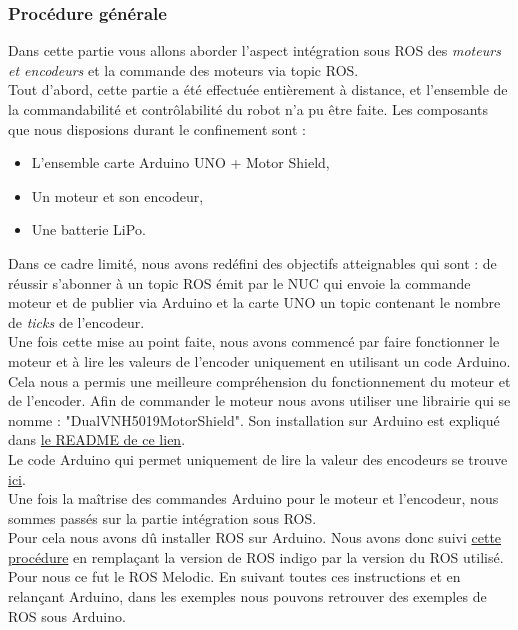 \documentclass[french]{rapportENSTAB}
\begin{document}
\subsubsection{Procédure générale}
Dans cette partie vous allons aborder l'aspect intégration sous ROS des \textit{moteurs et encodeurs} et la commande des moteurs via topic ROS.\\

Tout d'abord, cette partie a été effectuée entièrement à distance, et l'ensemble de la commandabilité et contrôlabilité du robot n'a pu être faite. Les composants que nous disposions durant le confinement sont : \begin{itemize}[label=\textbullet, font=\small\color{blue}]
    \item L'ensemble carte Arduino UNO + Motor Shield,
    \item Un moteur et son encodeur,
    \item Une batterie LiPo.
\end{itemize}

Dans ce cadre limité, nous avons redéfini des objectifs atteignables qui sont : de réussir s'abonner à un topic ROS émit par le NUC qui envoie la commande moteur et de publier via Arduino et la carte UNO un topic contenant le nombre de \textit{ticks} de l'encodeur.\\

Une fois cette mise au point faite, nous avons commencé par faire fonctionner le moteur et à lire les valeurs de l'encoder uniquement en utilisant un code Arduino. Cela nous a permis une meilleure compréhension du fonctionnement du moteur et de l'encoder. Afin de commander le moteur nous avons utiliser une librairie qui se nomme : "DualVNH5019MotorShield". Son installation sur Arduino est expliqué dans \href{https://github.com/AntoninLize/Projet_OrangeLabs/tree/master/Code/Arduino}{le README de ce lien}.\\

Le code Arduino qui permet uniquement de lire la valeur des encodeurs se trouve
\href{https://github.com/AntoninLize/Projet_OrangeLabs/tree/master/Code/Arduino/Encoder}{ici}.\\

Une fois la maîtrise des commandes Arduino pour le moteur et l'encodeur, nous sommes passés sur la partie intégration sous ROS.\\

Pour cela nous avons dû installer ROS sur Arduino. Nous avons donc suivi \href{http://wiki.ros.org/rosserial_arduino/Tutorials/Arduino%20IDE%20Setup}{cette procédure} en remplaçant la version de ROS indigo par la version du ROS utilisé. Pour nous ce fut le ROS Melodic. En suivant toutes ces instructions et en relançant Arduino, dans les exemples nous pouvons retrouver des exemples de ROS sous Arduino.\\ 
\end{document}
